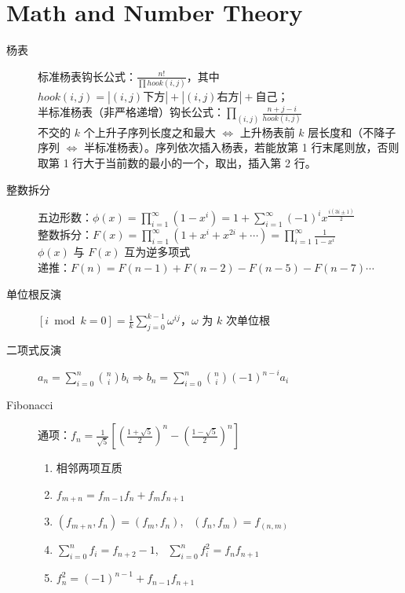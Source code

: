 \documentclass[6pt]{article}
\begin{document}
\begin{multicols}{2}
\begin{lstlisting}
\end{lstlisting}


  \section{Math and Number Theory}

  \begin{description}
    \item[杨表] 标准杨表钩长公式：$\frac{n!}{\prod hook(i,j)}$，其中 $hook(i,j) = |(i,j)\text{下方}| + |(i,j)\text{右方}|+\text{自己}$；\\
          半标准杨表（非严格递增）钩长公式：$\prod_{(i,j)} \frac{n+j-i}{hook(i,j)}$ \\
          不交的 $k$ 个上升子序列长度之和最大 $\Leftrightarrow$ 上升杨表前 $k$ 层长度和（不降子序列 $\Leftrightarrow$ 半标准杨表）。序列依次插入杨表，若能放第 1 行末尾则放，否则取第 1 行大于当前数的最小的一个，取出，插入第 2 行。
    \item[整数拆分] 五边形数：$\phi(x) = \prod_{i=1}^{\infty} (1-x^i) = 1+ \sum_{i=1}^{\infty} (-1)^i x^{\frac{i(3i\pm 1)}{2}}$ \\
          整数拆分：$F(x) = \prod_{i=1}^{\infty} (1+x^i+x^{2i}+ \cdots) = \prod_{i=1}^{\infty} \frac{1}{1-x^i}$ \\
          $\phi(x)$ 与 $F(x)$ 互为逆多项式 \\
          递推：$F(n) = F(n-1) + F(n-2) - F(n-5) - F(n-7) \cdots$
    \item[单位根反演] $[i \bmod k = 0] = \frac{1}{k} \sum_{j=0}^{k-1} \omega^{ij}$，$\omega$ 为 $k$ 次单位根
    \item[二项式反演] $a_n = \sum_{i=0}^n \binom{n}{i} b_i \Rightarrow b_n = \sum_{i=0}^n \binom{n}{i} (-1)^{n-i} a_i$
    \item[Fibonacci] 通项：$f_n = \frac{1}{\sqrt 5} \left[ \left(\frac{1+\sqrt 5}{2}\right)^n - \left(\frac{1-\sqrt 5}{2}\right)^n \right]$
          \begin{enumerate}
            \item 相邻两项互质
            \item $f_{m+n} = f_{m-1} f_n + f_m f_{n+1}$
            \item $(f_{m+n}, f_n) = (f_m, f_n)$, \ $(f_n, f_m) = f_{(n,m)}$
            \item $\sum_{i=0}^n f_i = f_{n+2} -1$, \ $\sum_{i=0}^n f_i^2 = f_n f_{n+1}$
            \item $f_n^2 = (-1)^{n-1} + f_{n-1} f_{n+1}$
          \end{enumerate}

\end{description}
\end{multicols}
\end{document}
